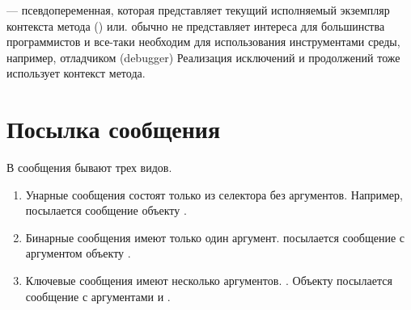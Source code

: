 \documentclass[a4paper,10pt,twoside]{book}
\begin{document}
 --- псевдопеременная, которая представляет текущий исполняемый экземпляр контекста метода () или.
 обычно не представляет интереса для большинства программистов и все-таки необходим для использования инструментами среды,
например, отладчиком (debugger) Реализация исключений и продолжений тоже использует контекст метода.


\section{Посылка сообщения}


В \pharo сообщения бывают трех видов.
\begin{enumerate}
	\item	Унарные сообщения состоят только из селектора без аргументов.
		Например,  посылается сообщение  объекту .
	\item 	Бинарные сообщения имеют только один аргумент.
		 посылается сообщение \ct{+} с аргументом  объекту .
	\item 	Ключевые сообщения имеют несколько аргументов.
		.
		Объекту  посылается сообщение  с аргументами  и .
\end{enumerate}
\end{document}
